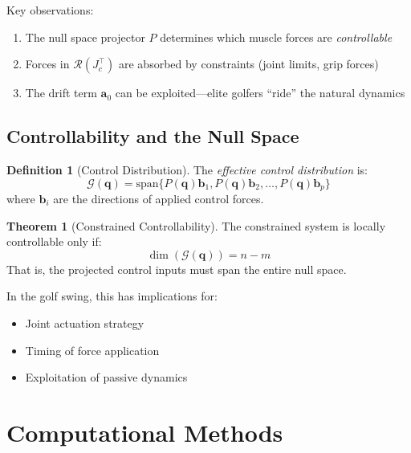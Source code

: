 \documentclass[11pt,a4paper]{article}
\theoremstyle{definition}
\newtheorem{definition}{Definition}[section]
\newtheorem{theorem}{Theorem}[section]
\newcommand{\rangespace}{\mathcal{R}}
\newcommand{\Jc}{J_c}
\newcommand{\qvec}{\bm{q}}
\newcommand{\avec}{\bm{a}}
\newcommand{\bvec}{\bm{b}}
\begin{document}
Key observations:
\begin{enumerate}
    \item The null space projector $P$ determines which muscle forces are \emph{controllable}
    \item Forces in $\rangespace(\Jc^\top)$ are absorbed by constraints (joint limits, grip forces)
    \item The drift term $\avec_0$ can be exploited---elite golfers ``ride'' the natural dynamics
\end{enumerate}

\subsection{Controllability and the Null Space}

\begin{definition}[Control Distribution]
The \emph{effective control distribution} is:
\begin{equation}
    \mathcal{G}(\qvec) = \text{span}\{P(\qvec) \bvec_1, P(\qvec) \bvec_2, \ldots, P(\qvec) \bvec_p\}
\end{equation}
where $\bvec_i$ are the directions of applied control forces.
\end{definition}

\begin{theorem}[Constrained Controllability]
The constrained system is locally controllable only if:
\begin{equation}
    \dim(\mathcal{G}(\qvec)) = n - m
\end{equation}
That is, the projected control inputs must span the entire null space.
\end{theorem}

In the golf swing, this has implications for:
\begin{itemize}[noitemsep]
    \item Joint actuation strategy
    \item Timing of force application
    \item Exploitation of passive dynamics
\end{itemize}

\section{Computational Methods}
\end{document}
